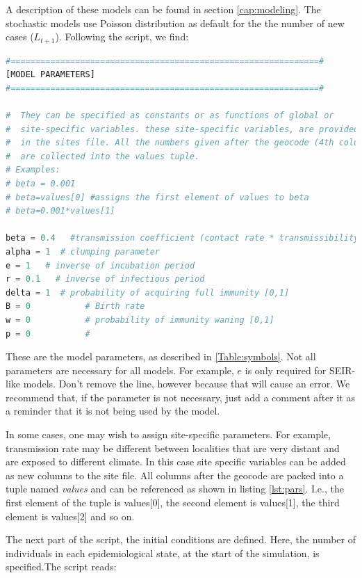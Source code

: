 A description of these models can be found in section \ref{cap:modeling}. The stochastic models use Poisson distribution as default for the the number of new cases ($L_{t+1}$). Following the script, we find:

\begin{lstlisting}[basicstyle=\footnotesize,language=Python, frame=trBL, caption= Defining model parameter and initial values ,label=lst:pars]
#==============================================================#
[MODEL PARAMETERS]
#==============================================================#

#  They can be specified as constants or as functions of global or 
#  site-specific variables. these site-specific variables, are provided
#  in the sites file. All the numbers given after the geocode (4th column)
#  are collected into the values tuple.
# Examples:
# beta = 0.001
# beta=values[0] #assigns the first element of values to beta 
# beta=0.001*values[1]

beta = 0.4   #transmission coefficient (contact rate * transmissibility)
alpha = 1  # clumping parameter
e = 1   # inverse of incubation period
r = 0.1   # inverse of infectious period
delta = 1  # probability of acquiring full immunity [0,1]
B = 0           # Birth rate
w = 0           # probability of immunity waning [0,1]
p = 0           # 

\end{lstlisting}

These are the model parameters, as described in \ref{Table:symbols}. Not all parameters are necessary for all models. For example, $e$ is only required for SEIR-like models. Don't
remove the line, however because that will cause an error. We recommend that, if the parameter is not necessary, just add a comment after it as a reminder that it is not being used by the model.

In some cases, one may wish to assign site-specific parameters. For example, transmission rate may be different between localities that are very distant and are exposed to different climate. In this case site specific variables can be added as new columns to the site file. All columns after the geocode are packed into a tuple named \textit{values} and can be referenced as shown in listing \ref{lst:pars}. I.e., the first element of the tuple is values[0], the second element is values[1], the third element is values[2] and so on.

The next part of the script, the initial conditions are defined. Here, the number of individuals in each epidemiological state, at the start of the simulation, is specified.The script reads:

